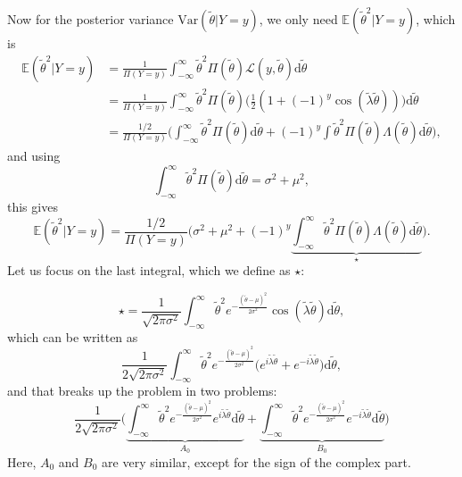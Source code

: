 \documentclass[]{report}
\begin{document}
Now for the posterior variance $\text{Var}(\tilde{\theta}|Y=y)$, we only need $\mathbb{E}(\tilde{\theta}^2 | Y=y)$, which is
\begin{align}
   \mathbb{E}(\tilde{\theta}^2 | Y=y) &= \frac{1}{\Pi(Y=y)} \int_{-\infty}^{\infty} \tilde{\theta}^2 \Pi(\tilde{\theta})\mathcal{L}(y, \tilde{\theta})\text{d}\tilde{\theta}\\
   &= \frac{1}{\Pi(Y=y)} \int_{-\infty}^{\infty} \tilde{\theta}^2 \Pi(\tilde{\theta})\Big(\frac{1}{2}(1 + (-1)^{y} \cos(\tilde{\lambda} \tilde{\theta}))\Big)\text{d}\tilde{\theta}\\
   &= \frac{1/2}{\Pi(Y=y)} \Bigg(\int_{-\infty}^{\infty}\tilde{\theta}^2\Pi(\tilde{\theta})\text{d}\tilde{\theta} + (-1)^y \int\tilde{\theta}^2\Pi(\tilde{\theta})\Lambda(\tilde{\theta})\text{d}\tilde{\theta}\Bigg),
\end{align}
and using
\begin{equation}
   \int_{-\infty}^{\infty}\tilde{\theta}^2\Pi(\tilde{\theta})\text{d}\tilde{\theta} = \sigma^2 + \mu^2,
\end{equation}
this gives
\begin{equation}
\label{eq:second-moment}
    \mathbb{E}(\tilde{\theta}^2 | Y=y) = \frac{1/2}{\Pi(Y=y)} \Bigg(\sigma^2 + \mu^2+ (-1)^y \underbrace{\int_{-\infty}^{\infty}\tilde{\theta}^2\Pi(\tilde{\theta})\Lambda(\tilde{\theta})\text{d}\tilde{\theta}}_{\star}\Bigg).
\end{equation}
Let us focus on the last integral, which we define as $\star$:

\begin{equation}
    \star = \frac{1}{\sqrt{2\pi \sigma^2}}\int_{-\infty}^{\infty}\tilde{\theta}^2e^{-\frac{(\tilde{\theta}-\mu)^2}{2\sigma^2}}\cos(\tilde{\lambda}\tilde{\theta})\text{d}\tilde{\theta},
\end{equation}
which can be written as
\begin{equation}
    \frac{1}{2\sqrt{2\pi \sigma^2}}\int_{-\infty}^{\infty}\tilde{\theta}^2e^{-\frac{(\tilde{\theta}-\mu)^2}{2\sigma^2}} \Big( e^{i\tilde{\lambda}\tilde{\theta}} + e^{-i\tilde{\lambda}\tilde{\theta}} \Big) \text{d}\tilde{\theta},
\end{equation}
and that breaks up the problem in two problems:
\begin{equation}
    \frac{1}{2\sqrt{2\pi \sigma^2}} \Big(
        \underbrace{\int_{-\infty}^{\infty}\tilde{\theta}^2e^{-\frac{(\tilde{\theta}-\mu)^2}{2\sigma^2}} e^{i\tilde{\lambda}\tilde{\theta}}\text{d}\tilde{\theta}}_{A_0} +
        \underbrace{\int_{-\infty}^{\infty}\tilde{\theta}^2e^{-\frac{(\tilde{\theta}-\mu)^2}{2\sigma^2}}e^{-i\tilde{\lambda}\tilde{\theta}}\text{d}\tilde{\theta}}_{B_0}
    \Big)
\end{equation}
Here, $A_0$ and $B_0$ are very similar, except for the sign of the complex part.
\end{document}
